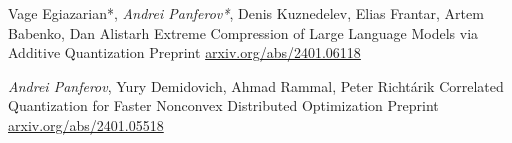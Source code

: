 
\begin{cventries}
  \cventry
    {Vage Egiazarian*, \textit{Andrei Panferov*}, Denis Kuznedelev, Elias Frantar, Artem Babenko, Dan Alistarh} %
    {Extreme Compression of Large Language Models via Additive Quantization} %
    {Preprint} %
    {\href{https://arxiv.org/abs/2401.06118}{\url{arxiv.org/abs/2401.06118}}} %
    {}

  \cventry
    {\textit{Andrei Panferov}, Yury Demidovich, Ahmad Rammal, Peter Richtárik} %
    {Correlated Quantization for Faster Nonconvex Distributed Optimization} %
    {Preprint} %
    {\href{https://arxiv.org/abs/2401.05518}{\url{arxiv.org/abs/2401.05518}}} %
    {}

    
\end{cventries}

